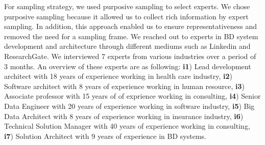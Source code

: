 \documentclass[a4paper,11pt,article,oneside]{memoir}
\begin{document}
For sampling strategy, we used purposive sampling \citep{baltes2022sampling} to select experts. We chose purposive sampling because it allowed us to collect rich information by expert sampling. In addition, this approach enabled us to ensure representativeness and removed the need for a sampling frame. We reached out to experts in BD system development and architecture through different mediums such as Linkedin and ResearchGate. We interviewed 7 experts from various industries over a period of 3 months. An overview of these experts are as following: \textbf{i1}) Lead development architect with 18 years of experience working in health care industry, \textbf{i2}) Software architect with 8 years of experience working in human resource, \textbf{i3}) Associate professor with 15 years of of exprience working in consulting, \textbf{i4}) Senior Data Engineer with 20 years of experience working in software industry, \textbf{i5}) Big Data Architect with 8 years of experience working in insurance industry, \textbf{i6}) Technical Solution Manager with 40 years of experience working in consulting, \textbf{i7}) Solution Architect with 9 years of experience in BD systems. 


\end{document}

